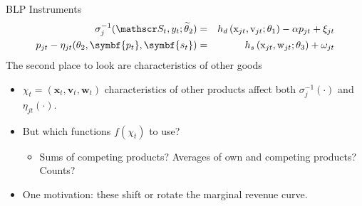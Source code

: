 \documentclass[aspectratio=169,11pt]{beamer}
\begin{document}
\begin{frame}{BLP Instruments}
\begin{eqnarray*}
    \sigma_j^{-1}(\calS_t,y_t;\widetilde{\theta}_2) &=&  h_d\left(\mathrm{x}_{jt}, \mathrm{v}_{jt}; \theta_1 \right)  - \alpha p_{jt} + \xi_{jt}\\
    p_{jt} - \eta_{jt}(\theta_2,\symbf{p_t},\symbf{s_t}) &=&   h_s\left(\mathrm{x}_{jt},\mathrm{w}_{jt};\theta_3 \right)+\omega_{jt}
\end{eqnarray*}
The second place to look are characteristics of other goods
\begin{itemize}
\item $\chi_t = (\symbf{x}_{t},\symbf{v}_{t},\symbf{w}_{t})$ characteristics of other products affect both $\sigma_{j}^{-1}(\cdot)$ and $\eta_{jt}(\cdot)$.
\item But which functions $f(\chi_t)$ to use?
\begin{itemize}
\item Sums of competing products? Averages of own and competing products? Counts?
\end{itemize}
\item One motivation: these shift or rotate the \alert{marginal revenue curve}.
\end{itemize}
\end{frame}



\end{document}
